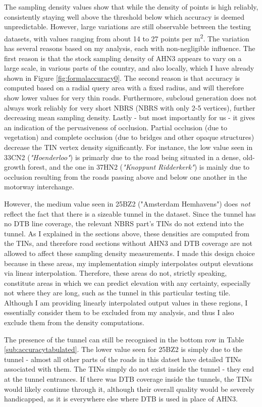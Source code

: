 The sampling density values show that while the density of points is high reliably, consistently staying well above the threshold below which accuracy is deemed unpredictable. However, large variations are still observable between the testing datasets, with values ranging from about 14 to 27 points per m\textsuperscript{2}. The variation has several reasons based on my analysis, each with non-negligible influence. The first reason is that the stock sampling density of AHN3 appears to vary on a large scale, in various parts of the country, and also locally, which I have already shown in Figure \ref{fig:formalaccuracy0}. The second reason is that accuracy is computed based on a radial query area with a fixed radius, and will therefore show lower values for very thin roads. Furthermore, subcloud generation does not always work reliably for very short NBRS (NBRS with only 2-5 vertices), further decreasing mean sampling density. Lastly - but most importantly for us - it gives an indication of the pervasiveness of occlusion. Partial occlusion (due to vegetation) and complete occlusion (due to bridges and other opaque structures) decrease the TIN vertex density significantly. For instance, the low value seen in 33CN2 (\textit{"Hoenderloo"}) is primarly due to the road being situated in a dense, old-growth forest, and the one in 37HN2 (\textit{"Knoppunt Ridderkerk"}) is mainly due to occlusion resulting from the roads passing above and below one another in the motorway interchange.

However, the medium value seen in 25BZ2 ("Amsterdam Hemhavens") does \textit{not} reflect the fact that there is a sizeable tunnel in the dataset. Since the tunnel has no DTB line coverage, the relevant NBRS part's TINs do not extend into the tunnel. As I explained in the sections above, these densities are computed from the TINs, and therefore road sections without AHN3 and DTB coverage are not allowed to affect these sampling density measurements. I made this design choice because in these areas, my implementation simply interpolates output elevations via linear interpolation. Therefore, these areas do not, strictly speaking, constitute areas in which we can predict elevation with any certainty, especially not where they are long, such as the tunnel in this particular testing tile. Although I am providing linearly interpolated output values in these regions, I essentially consider them to be excluded from my analysis, and thus I also exclude them from the density computations.

The presence of the tunnel can still be recognised in the bottom row in Table \ref{sub:accuracytabulated}. The lower value seen for 25BZ2 is simply due to the tunnel - almost all other parts of the roads in this datset have detailed TINs associated with them. The TINs simply do not exist inside the tunnel - they end at the tunnel entrances. If there was DTB coverage inside the tunnels, the TINs would likely continue through it, although their overall quality would be severely handicapped, as it is everywhere else where DTB is used in place of AHN3.

